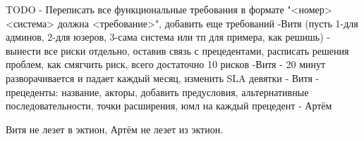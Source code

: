 TODO
- Переписать все функциональные требования в формате "<номер> <система> должна <требование>", добавить еще требований -Витя 
(пусть 1-для админов, 2-для юзеров, 3-сама система или тп для примера, как решишь)
- вынести все риски отдельно, оставив связь с прецедентами, расписать решения проблем, как смягчить риск, всего достаточно 10 рисков -Витя
- 20 минут разворачивается и падает каждый месяц, изменить SLA девятки - Витя
- прецеденты: название, акторы, добавить предусловия, альтернативные последовательности, точки расширения, юмл на каждый прецедент - Артём

Витя не лезет в эктион, Артём не лезет из эктион.